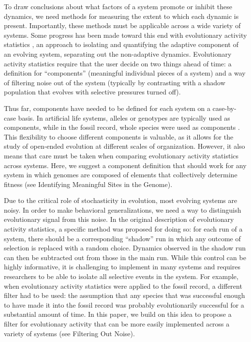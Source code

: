 \documentclass[letterpaper]{article}
\begin{document}
To draw conclusions about what factors of a system promote or inhibit these dynamics, we need methods for measuring the extent to which each dynamic is present. Importantly, these methods must be applicable across a wide variety of systems. Some progress has been made toward this end with evolutionary activity statistics \citep{bedau_classification_1998, channon_passing_2001}, an approach to isolating and quantifying the adaptive component of an evolving system, separating out the non-adaptive dynamics. Evolutionary activity statistics require that the user decide on two things ahead of time: a definition for ``components'' (meaningful individual pieces of a system) and a way of filtering noise out of the system (typically by contrasting with a shadow population that evolves with selective pressures turned off). 

Thus far, components have needed to be defined for each system on a case-by-case basis.  In artificial life systems, alleles or genotypes are typically used as components, while in the fossil record, whole species were used as components \citep{bedau1998classification}.
This flexibility to choose different components is valuable, as it allows for the study of open-ended evolution at different scales of organization. However, it also means that care must be taken when comparing evolutionary activity statistics across systems. Here, we suggest a component definition that should work for any system in which genomes are composed of elements that collectively determine fitness (see Identifying Meaningful Sites in the Genome).

Due to the critical role of stochasticity in evolution, most evolving systems are noisy. In order to make behavioral generalizations, we need a way to distinguish evolutionary signal from this noise. In the original description of evolutionary activity statistics, a specific method was proposed for doing so: for each run of a system, there should be a corresponding ``shadow'' run in which any outcome of selection is replaced with a random choice. Dynamics observed in the shadow run can then be subtracted out from those in the main run. While this control can be highly informative, it is challenging to implement in many systems and requires researchers to be able to isolate all selective events in the system. For example, when evolutionary activity statistics were applied to the fossil record, a different filter had to be used: the assumption that any species that was successful enough to have made it into the fossil record was probably evolutionarily successful for a substantial amount of time. In this paper, we build on this idea to propose a filter for evolutionary activity that can be more easily implemented across a variety of systems (see Filtering Out Noise).
\end{document}
